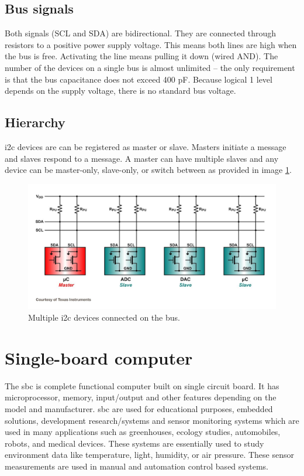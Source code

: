 \subsection{Bus signals} %
 \label{sub:bus_signals}
Both signals (SCL and SDA) are bidirectional. They are connected through resistors to a positive power supply voltage. This means both lines are high when the bus is free. Activating the line means pulling it down (wired AND). The number of the devices on a single bus is almost unlimited – the only requirement is that the bus capacitance does not exceed 400 pF. Because logical 1 level depends on the supply voltage, there is no standard bus voltage.\cite{i2c_bus_signal}
\subsection{Hierarchy} %
\label{sub:hierarchy}
\gls{i2c} devices are can be registered as master or slave. Masters initiate a message and
slaves respond to a message. A master can have multiple slaves and any device can
be master-only, slave-only, or switch between as provided in image \ref{fig:ch1}.
\begin{figure}[H]
\begin{center}
\captionsetup{font=small}
\includegraphics[scale=0.33]{pics/i2c_hierarchy.jpg}
\caption{Multiple \gls{i2c} devices connected on the bus.\cite{i2c_bus_pic}}
\label{fig:ch1}
\end{center}
\end{figure}

\section{Single-board computer}
The \gls{sbc} is complete functional computer built on single circuit board. It has microprocessor, memory, input/output and other features depending on the model and manufacturer. \gls{sbc} are used for educational purposes, embedded solutions, development research/systems and sensor monitoring systems which are used in many applications such as greenhouses, ecology studies, automobiles, robots, and medical devices. These systems are essentially used to study environment data like temperature, light, humidity, or air pressure. These sensor measurements are used in manual and automation control based systems\cite{6028693}.  

